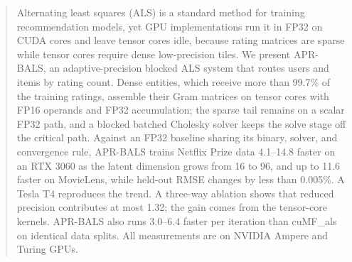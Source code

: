 \begin{abstract}
Alternating least squares (ALS) is a standard method for training recommendation models, yet GPU implementations run it in FP32 on CUDA cores and leave tensor cores idle, because rating matrices are sparse while tensor cores require dense low-precision tiles. We present APR-BALS, an adaptive-precision blocked ALS system that routes users and items by rating count. Dense entities, which receive more than 99.7\% of the training ratings, assemble their Gram matrices on tensor cores with FP16 operands and FP32 accumulation; the sparse tail remains on a scalar FP32 path, and a blocked batched Cholesky solver keeps the solve stage off the critical path. Against an FP32 baseline sharing its binary, solver, and convergence rule, APR-BALS trains Netflix Prize data 4.1--14.8\texttimes{} faster on an RTX 3060 as the latent dimension grows from 16 to 96, and up to 11.6\texttimes{} faster on MovieLens, while held-out RMSE changes by less than 0.005\%. A Tesla T4 reproduces the trend. A three-way ablation shows that reduced precision contributes at most 1.32\texttimes{}; the gain comes from the tensor-core kernels. APR-BALS also runs 3.0--6.4\texttimes{} faster per iteration than cuMF\_als on identical data splits. All measurements are on NVIDIA Ampere and Turing GPUs.
\end{abstract}

